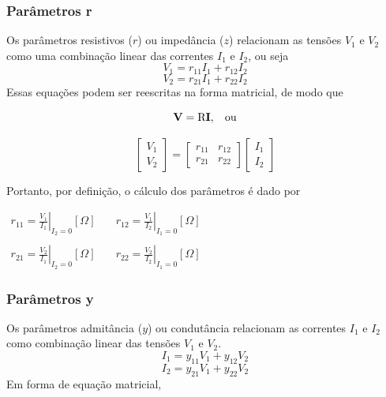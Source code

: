 \documentclass{article}
\numberwithin{equation}{section}
\begin{document}
\subsubsection{Parâmetros r}
\label{subsubsec:quadripolosr}
Os parâmetros resistivos ($r$) ou impedância ($z$) relacionam as tensões $V_{1}$ e $V_{2}$ como uma combinação linear das correntes $I_{1}$ e $I_{2}$, ou seja
\begin{equation*}
    V_{1}=r_{11}I_{1}+r_{12}I_{2}
\end{equation*}
\begin{equation*}
    V_{2}=r_{21}I_{1}+r_{22}I_{2}
\end{equation*}
Essas equações podem ser reescritas na forma matricial, de modo que

\begin{equation*}
    \textbf{V}=\text{R}\textbf{I}, \hspace{0.3cm} \text{ou}
\end{equation*}

\begin{equation}
    \begin{bmatrix}
        V_{1} \\
        V_{2}
    \end{bmatrix}
    = %
    \begin{bmatrix}
        r_{11} & r_{12} \\
        r_{21} & r_{22}
    \end{bmatrix}
    \begin{bmatrix}
        I_{1} \\
        I_{2}
    \end{bmatrix}
\end{equation}

Portanto, por definição, o cálculo dos parâmetros é dado por
\begin{center}
    $\begin{matrix} %
            r_{11}=\displaystyle\left.\frac{V_{1}}{I_{1}}\right|_{I_{2}=0} [\Omega] & \quad r_{12}=\displaystyle\left.\frac{V_{1}}{I_{2}}\right|_{I_{1}=0} [\Omega]\\ \\
            r_{21}=\displaystyle\left.\frac{V_{2}}{I_{1}}\right|_{I_{2}=0} [\Omega] & \quad  r_{22}=\displaystyle\left.\frac{V_{2}}{I_{2}}\right|_{I_{1}=0} [\Omega]
    \end{matrix}$
\end{center}
\subsubsection{Parâmetros y}
\label{subsubsec:quadripolosy}
Os parâmetros admitância ($y$) ou condutância relacionam as correntes $I_{1}$ e $I_{2}$ como combinação linear das tensões $V_{1}$ e $V_{2}$.
\begin{equation*}
    I_{1}=y_{11}V_{1}+y_{12}V_{2}
\end{equation*}
\begin{equation*}
    I_{2}=y_{21}V_{1}+y_{22}V_{2}
\end{equation*}
Em forma de equação matricial,
\end{document}
